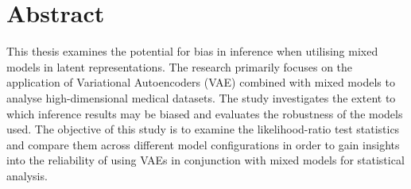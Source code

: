 \documentclass[%
thesis=student,%
coverpage=false,%
titlepage=false,%
headmarks=true, %
german,%
font=libertine, %
math=newpxtx, %
BCOR=5mm,%
coverBCOR=11mm%
]{tumbook}
\theoremstyle{break}
\begin{document}
\cleardoublepage{}

\tableofcontents

\cleardoublepage{}

\section*{Abstract}
This thesis examines the potential for bias in inference when utilising mixed models in latent representations. The research primarily focuses on the application of Variational Autoencoders (VAE) combined with mixed models to analyse high-dimensional medical datasets. The study investigates the extent to which inference results may be biased and evaluates the robustness of the models used. The objective of this study is to examine the likelihood-ratio test statistics and compare them across different model configurations in order to gain insights into the reliability of using VAEs in conjunction with mixed models for statistical analysis.
\mainmatter{}
\end{document}
